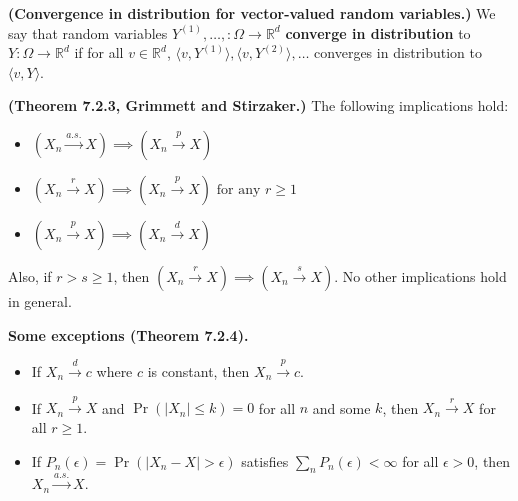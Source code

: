 \begin{definition} \textbf{(Convergence in distribution for vector-valued random variables.)} We say that random variables \(Y^{(1)}, \ldots, : \Omega \to \mathbb{R}^d\) \textbf{converge in distribution} to \(Y: \Omega \to \mathbb{R}^d\) if for all \(v \in \mathbb{R}^d\), \(\langle v, Y^{(1)} \rangle, \langle v, Y^{(2)} \rangle, \ldots\) converges in distribution to \(\langle v, Y \rangle\).

\end{definition}

\begin{theorem}
\textbf{(Theorem 7.2.3, Grimmett and Stirzaker.)} The following implications hold:

\begin{itemize}

\item \( (X_n \xrightarrow{a.s.} X) \implies (X_n \xrightarrow{p} X) \)

\item \( (X_n \xrightarrow{r} X) \implies (X_n \xrightarrow{p} X) \text{ for any } r \geq 1 \)

\item \( (X_n \xrightarrow{p} X) \implies (X_n \xrightarrow{d} X) \)

\end{itemize}

Also, if \(r > s \geq 1\), then \((X_n \xrightarrow{r} X) \implies (X_n \xrightarrow{s} X)\). No other implications hold in general.
\end{theorem}

\begin{theorem}\label{asym.7.2.4}\textbf{Some exceptions (Theorem 7.2.4).}

\begin{itemize}

\item If \(X_n \xrightarrow{d} c\) where \(c\) is constant, then \(X_n \xrightarrow{p} c\).

\item If \(X_n \xrightarrow{p} X\) and \(\Pr(|X_n| \leq k) = 0\) for all \(n\) and some \(k\), then \(X_n \xrightarrow{r} X\) for all \(r \geq 1\).

\item If \(P_n(\epsilon) = \Pr(|X_n - X| > \epsilon)\) satisfies \(\sum_n P_n(\epsilon) < \infty\) for all \(\epsilon > 0\), then \(X_n \xrightarrow{a.s.} X\). 

\end{itemize}
\end{theorem}

